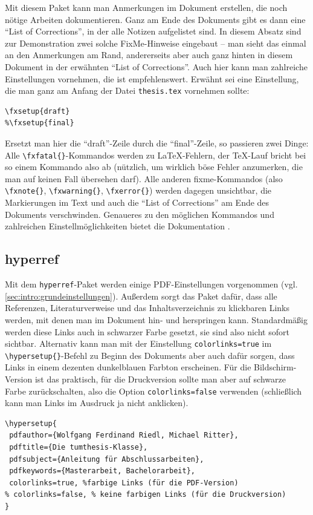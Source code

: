 Mit diesem Paket kann man Anmerkungen im Dokument erstellen, die noch nötige
Arbeiten dokumentieren. Ganz am
Ende des Dokuments gibt es dann eine \enquote{List of Corrections}, in der alle
Notizen aufgelistet sind. In diesem Absatz sind zur Demonstration zwei solche
FixMe-Hinweise eingebaut -- man sieht das einmal an den Anmerkungen am Rand,
andererseits aber auch ganz hinten in diesem Dokument in der erwähnten
\enquote{List of Corrections}. Auch hier kann man zahlreiche Einstellungen
vornehmen, die  ist
empfehlenswert. Erwähnt sei eine Einstellung, die man ganz am Anfang der Datei
\texttt{thesis.tex} vornehmen sollte:
\begin{lstlisting}[language={[LaTeX]TeX}]
%FixMe-Status: final (keine FixMe-Anmerkungen) oder draft (Anmerkungen sichtbar)
\fxsetup{draft}
%\fxsetup{final}
\end{lstlisting}

Ersetzt man hier die \enquote{draft}-Zeile durch die \enquote{final}-Zeile, so
passieren zwei Dinge: Alle \verb|\fxfatal{}|-Kommandos werden zu \LaTeX-Fehlern,
der \TeX-Lauf bricht bei so einem Kommando also ab (nützlich, um wirklich böse
Fehler anzumerken, die man auf keinen Fall übersehen darf). Alle anderen
fixme-Kommandos (also \verb|\fxnote{}|, \verb|\fxwarning{}|, \verb|\fxerror{}|)
werden dagegen unsichtbar, die Markierungen im Text und auch die \enquote{List
  of Corrections} am Ende des Dokuments verschwinden. Genaueres zu den möglichen
Kommandos und zahlreichen Einstellmöglichkeiten bietet die Dokumentation
\cite{fixme}.

\subsection{hyperref}
\label{sec:intro:hyperref}

Mit dem \texttt{hyperref}-Paket werden einige PDF-Einstellungen vorgenommen
(vgl. \cref{sec:intro:grundeinstellungen}). Außerdem sorgt das Paket dafür, dass
alle Referenzen, Literaturverweise und das Inhaltsverzeichnis zu klickbaren
Links werden, mit denen man im Dokument hin- und herspringen kann. Standardmäßig
werden diese Links auch in schwarzer Farbe gesetzt, sie sind also nicht sofort
sichtbar. Alternativ kann man mit der Einstellung \texttt{colorlinks=true} im
\verb|\hypersetup{}|-Befehl zu Beginn des Dokuments aber auch dafür sorgen, dass
Links in einem dezenten dunkelblauen Farbton erscheinen. Für die
Bildschirm-Version ist das praktisch, für die Druckversion sollte man aber auf
schwarze Farbe zurückschalten, also die Option \texttt{colorlinks=false}
verwenden (schließlich kann man Links im Ausdruck ja nicht anklicken).
\begin{lstlisting}[language={[LaTeX]TeX}]
\hypersetup{
 pdfauthor={Wolfgang Ferdinand Riedl, Michael Ritter},
 pdftitle={Die tumthesis-Klasse},
 pdfsubject={Anleitung für Abschlussarbeiten},
 pdfkeywords={Masterarbeit, Bachelorarbeit},
 colorlinks=true, %farbige Links (für die PDF-Version)
% colorlinks=false, % keine farbigen Links (für die Druckversion)
}
\end{lstlisting}

